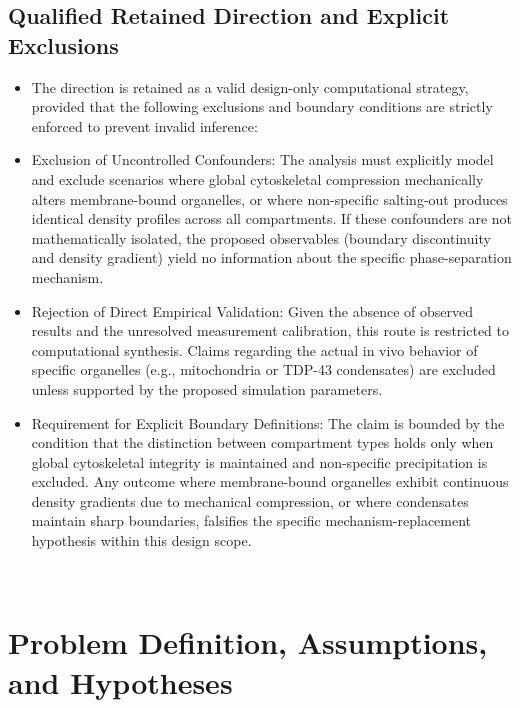 \documentclass[conference]{IEEEtran}
\begin{document}
\subsection{Qualified Retained Direction and Explicit Exclusions}
\begin{itemize}
\item The direction is retained as a valid design-only computational strategy, provided that the following exclusions and boundary conditions are strictly enforced to prevent invalid inference:
\item Exclusion of Uncontrolled Confounders: The analysis must explicitly model and exclude scenarios where global cytoskeletal compression mechanically alters membrane-bound organelles, or where non-specific salting-out produces identical density profiles across all compartments. If these confounders are not mathematically isolated, the proposed observables (boundary discontinuity and density gradient) yield no information about the specific phase-separation mechanism.
\item Rejection of Direct Empirical Validation: Given the absence of observed results and the unresolved measurement calibration, this route is restricted to computational synthesis. Claims regarding the actual in vivo behavior of specific organelles (e.g., mitochondria or TDP-43 condensates) are excluded unless supported by the proposed simulation parameters.
\item Requirement for Explicit Boundary Definitions: The claim is bounded by the condition that the distinction between compartment types holds only when global cytoskeletal integrity is maintained and non-specific precipitation is excluded. Any outcome where membrane-bound organelles exhibit continuous density gradients due to mechanical compression, or where condensates maintain sharp boundaries, falsifies the specific mechanism-replacement hypothesis within this design scope.
\end{itemize}~\cite{cite_3480a6462f7a2d86}

\section{Problem Definition, Assumptions, and Hypotheses}
\end{document}
